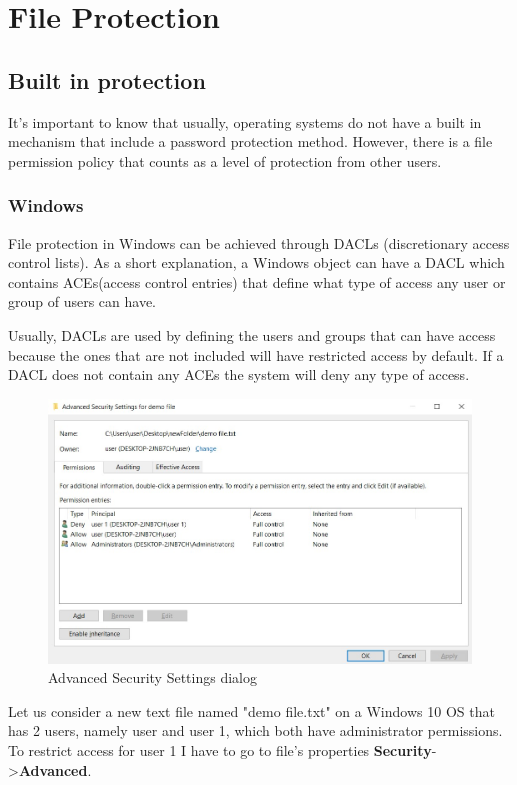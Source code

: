 \chapter{File Protection}
	\section{Built in protection}
	It's important to know that usually, operating systems do not have a built in mechanism that include a password protection method. However, there is a file permission policy that counts as a level of protection from other users.
	
	\subsection{Windows}
	File protection in Windows can be achieved through DACLs (discretionary access control lists). As a short explanation, a Windows object can have a DACL which contains ACEs(access control entries) that define what type of access any user or group of users can have. \cite{MDSNDACsLACEs}
		
	Usually, DACLs are used by defining the users and groups that can have access because the ones that are not included will have restricted access by default. If a DACL does not contain any ACEs the system will deny any type of access.
	
	\begin{figure}[h!]
		\includegraphics[width=\linewidth]{images/securitySettings.jpg}
		\caption{Advanced Security Settings dialog}
		\label{fig:securitySettings}
	\end{figure}
	
	Let us consider a new text file named "demo file.txt" on a Windows 10 OS that has 2 users, namely user and user 1, which both have administrator permissions. To restrict access for user 1 I have to go to file's properties \textbf{Security}-\textgreater\textbf{Advanced}.

